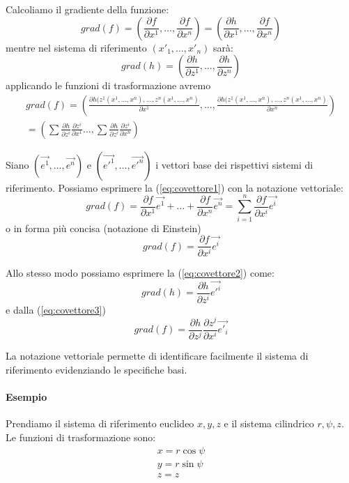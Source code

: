 \documentclass[a4paper,11pt]{article}
\begin{document}
Calcoliamo il gradiente della funzione:
\begin{equation}\label{eq:covettore1}
 	grad (f) = \left( \frac{\partial f}{\partial x^1} , \dots, \frac{\partial f}{\partial x^n} \right)
 	= \left( \frac{\partial h}{\partial x^1} , \dots, \frac{\partial f}{\partial x^n} \right)
\end{equation} 
mentre nel sistema di riferimento $ (x'_1, \dots, x'_n) $ sarà:
\begin{equation}\label{eq:covettore2}
	grad (h)= \left( \frac{\partial h}{\partial z^1}, \dots, \frac{\partial h}{\partial z^n} \right)
\end{equation}
applicando le funzioni di trasformazione avremo
\begin{equation}\label{eq:covettore3}
\begin{array}{r}
	grad (f) = \left(
	 \frac{\partial h(z^1 ( x^1, \dots, x^n), \dots, z^n ( x^1, \dots, x^n)}{\partial x^1} ,
	\dots,
	\frac{\partial h(z^1 ( x^1, \dots, x^n), \dots, z^n ( x^1, \dots, x^n)}{\partial x^n} 
	\right)
\\
	= \left(
	 \sum \frac{\partial h}{\partial z^i} \frac{\partial z^i}{\partial x^1}
	\dots,
	 \sum \frac{\partial h}{\partial z^i} \frac{\partial z^i}{\partial x^n}
	\right)
\end{array}
\end{equation}

Siano $ (\vec {e^1}, \dots , \vec {e^n}) $ e $ (\vec {{e'}^1}, \dots , \vec {{e'}^n}) $
i vettori base dei rispettivi
sistemi di riferimento. Possiamo esprimere la (\ref{eq:covettore1}) con la notazione vettoriale:
\[ grad (f) = \frac{\partial f}{\partial x^1 } \vec {e^1} + \dots + \frac{\partial f}{\partial x^n} \vec {e^n}
	= \sum_{i=1}^n \frac{\partial f}{\partial x^i} \vec {e^i}
\]
o in forma più concisa (notazione di Einstein)
\[ grad(f) = \frac{\partial f}{\partial x^i} \vec {e^i} \]

Allo stesso modo possiamo esprimere la (\ref{eq:covettore2}) come:
\[ grad (h) = \frac{\partial h}{\partial z^i} \vec {{e'}^i} \]
e dalla (\ref{eq:covettore3})
\[ grad (f) = \frac{\partial h}{\partial z^j} \frac{\partial z^j}{\partial x^i}  \vec {{e'}_i} \]

La notazione vettoriale permette di identificare facilmente il sistema di riferimento evidenziando le specifiche basi.

\paragraph{Esempio}
Prendiamo il sistema di riferimento euclideo $ x, y, z $ e il sistema cilindrico $ r, \psi , z $.
Le funzioni di trasformazione sono:
\begin{eqnarray*}
  x = r \cos \psi
  \\
  y = r \sin \psi
  \\
  z = z
\end{eqnarray*}
\end{document}
